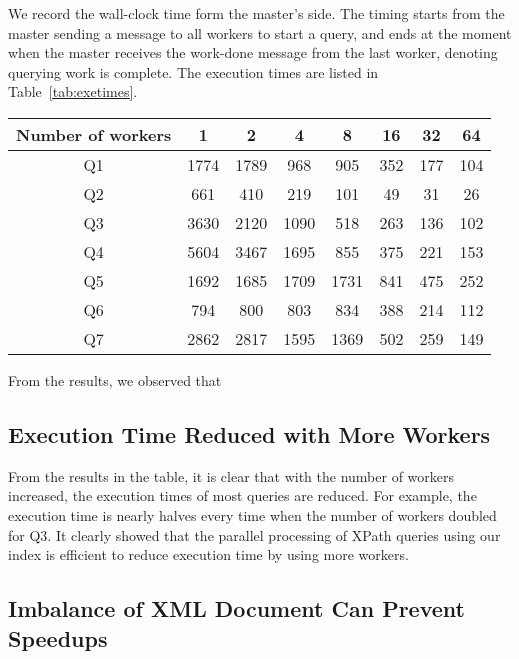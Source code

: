 We record the wall-clock time form the master's side. The timing starts from the
master sending a message to all workers to start a query, and ends at the moment
when the master receives the work-done message from the last worker, denoting
querying work is complete. The execution times are listed in
Table~\ref{tab:exetimes}.


\begin{table*}[ht]
\centering
\caption{Execution time (ms).}
\label{tab:exetimes}
\begin{tabular}{|c|c|c|c|c|c|c|c|}
\hline
Number of workers & 1       & 2       & 4       & 8       & 16      & 32      & 64      \\ \hline
Q1                & 1774    & 1789    & 968     & 905     & 352     & 177     & 104 \\ \hline
Q2                & 661     & 410     & 219     & 101     &  49     & 31      & 26 \\ \hline
Q3                & 3630    & 2120    & 1090    & 518     & 263     & 136     & 102 \\ \hline
Q4                & 5604    & 3467    & 1695    & 855     & 375     & 221     & 153 \\ \hline
Q5                & 1692    & 1685    & 1709    & 1731    & 841     & 475     & 252 \\ \hline
Q6                & 794     & 800     & 803     & 834     & 388     & 214     & 112 \\ \hline
Q7                & 2862    & 2817    & 1595    & 1369    & 502     & 259     & 149 \\ \hline
\end{tabular}
\end{table*}

From the results, we observed that

\subsection{Execution Time Reduced with More Workers}

From the results in the table, it is clear that with the number of workers
increased, the execution times of most queries are reduced. For
example, the execution time is nearly halves every time when the number of
workers doubled for Q3. It clearly showed that the parallel processing of
XPath queries using our index is efficient to reduce execution time by using 
more workers.

\subsection{Imbalance of XML Document Can Prevent Speedups}

